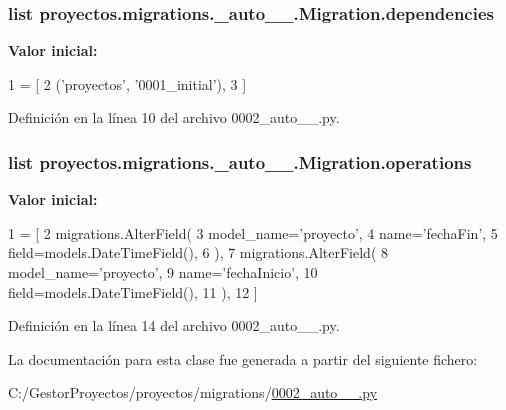 \subsubsection[{\texorpdfstring{dependencies}{dependencies}}]{\setlength{\rightskip}{0pt plus 5cm}list proyectos.\+migrations.\+\_\+auto\+\_\+\_.\+Migration.\+dependencies\hspace{0.3cm}{\ttfamily [static]}}\hypertarget{classproyectos_1_1migrations_1_10002__auto__20160610__1357_1_1_migration_aeb0c86388ea33c9c4eb0c3df25554f26}{}\label{classproyectos_1_1migrations_1_10002__auto__20160610__1357_1_1_migration_aeb0c86388ea33c9c4eb0c3df25554f26}
{\bfseries Valor inicial\+:}
\begin{DoxyCode}
1 = [
2         (\textcolor{stringliteral}{'proyectos'}, \textcolor{stringliteral}{'0001\_initial'}),
3     ]
\end{DoxyCode}


Definición en la línea 10 del archivo 0002\+\_\+auto\+\_\+\_.\+py.

\subsubsection[{\texorpdfstring{operations}{operations}}]{\setlength{\rightskip}{0pt plus 5cm}list proyectos.\+migrations.\+\_\+auto\+\_\+\_.\+Migration.\+operations\hspace{0.3cm}{\ttfamily [static]}}\hypertarget{classproyectos_1_1migrations_1_10002__auto__20160610__1357_1_1_migration_a04b80529312bac25450808d730733a31}{}\label{classproyectos_1_1migrations_1_10002__auto__20160610__1357_1_1_migration_a04b80529312bac25450808d730733a31}
{\bfseries Valor inicial\+:}
\begin{DoxyCode}
1 = [
2         migrations.AlterField(
3             model\_name=\textcolor{stringliteral}{'proyecto'},
4             name=\textcolor{stringliteral}{'fechaFin'},
5             field=models.DateTimeField(),
6         ),
7         migrations.AlterField(
8             model\_name=\textcolor{stringliteral}{'proyecto'},
9             name=\textcolor{stringliteral}{'fechaInicio'},
10             field=models.DateTimeField(),
11         ),
12     ]
\end{DoxyCode}


Definición en la línea 14 del archivo 0002\+\_\+auto\+\_\+\_.\+py.



La documentación para esta clase fue generada a partir del siguiente fichero\+:\begin{DoxyCompactItemize}
\item 
C\+:/\+Gestor\+Proyectos/proyectos/migrations/\hyperlink{proyectos_2migrations_20002__auto__20160610__1357_8py}{0002\+\_\+auto\+\_\+\_.\+py}\end{DoxyCompactItemize}

